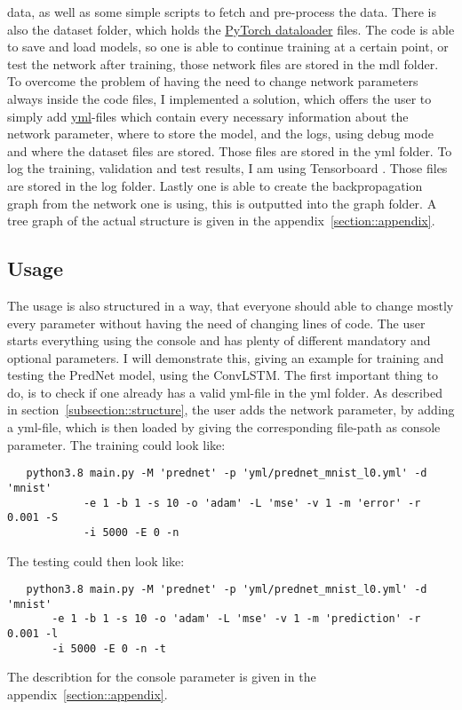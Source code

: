   data, as well as some simple scripts to fetch and pre-process the data. There is also the dataset folder, which holds the \href{https://pytorch.org/docs/stable/
  data.html}{PyTorch dataloader} files. The code is able to save and load models, so one is able to continue training at a certain point, or test the network
  after training, those network files are stored in the mdl folder. To overcome the problem of having the need to change network parameters always inside the
  code files, I implemented a solution, which offers the user to simply add \href{https://yaml.org/}{yml}-files which contain every necessary information about 
  the network parameter, where to store the model, and the logs, using debug mode and where the dataset files are stored. Those files are stored in the yml 
  folder. To log the training, validation and test results, I am using Tensorboard \cite{tensorflow2015}. Those files are stored in the log folder.
  Lastly one is able to create the backpropagation graph from the network one is using, this is outputted into the graph folder.
  A tree graph of the actual structure is given in the appendix~\ref{section::appendix}.
  
 \subsection{Usage}
  The usage is also structured in a way, that everyone should able to change mostly every parameter without having the need of changing lines of code.
  The user starts everything using the console and has plenty of different mandatory and optional parameters. I will demonstrate this, giving an example for
  training and testing the PredNet model, using the ConvLSTM. The first important thing to do, is to check if one already has a valid yml-file in the yml folder.
  As described in section~\ref{subsection::structure}, the user adds the network parameter, by adding a yml-file, which is then loaded by giving the corresponding 
  file-path as console parameter. The training could look like:
  \begin{lstlisting}
   python3.8 main.py -M 'prednet' -p 'yml/prednet_mnist_l0.yml' -d 'mnist'
            -e 1 -b 1 -s 10 -o 'adam' -L 'mse' -v 1 -m 'error' -r 0.001 -S
            -i 5000 -E 0 -n
  \end{lstlisting} \noindent
  The testing could then look like:
  \begin{lstlisting}
   python3.8 main.py -M 'prednet' -p 'yml/prednet_mnist_l0.yml' -d 'mnist'
       -e 1 -b 1 -s 10 -o 'adam' -L 'mse' -v 1 -m 'prediction' -r 0.001 -l
       -i 5000 -E 0 -n -t
  \end{lstlisting}
  The describtion for the console parameter is given in the appendix~\ref{section::appendix}.

